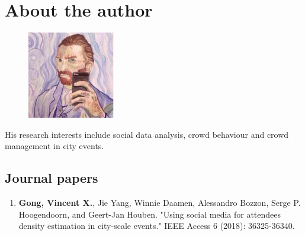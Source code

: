 \chapter*{About the author}


\begin{figure}
\includegraphics[width=0.34\textwidth, trim=0 0 0 0.8cm]{./0-misc/images/vincent.jpg}
\end{figure}

His research interests include social data analysis, crowd behaviour and crowd management in city events.



\vspace*{\fill}
\pagebreak

\vspace*{0.60cm}

\section*{Journal papers}

\begin{enumerate}
  \item \textbf{Gong, Vincent X.}, Jie Yang, Winnie Daamen, Alessandro Bozzon, Serge P. Hoogendoorn, and Geert-Jan Houben. "Using social media for attendees density estimation in city-scale events." IEEE Access 6 (2018): 36325-36340.
\end{enumerate}



